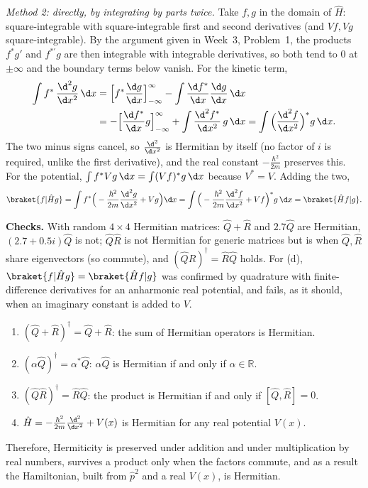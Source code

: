 \begin{solutionbox}
\emph{Method 2: directly, by integrating by parts twice.} Take $f,g$ in the domain of $\hat H$: square-integrable with square-integrable first and second derivatives (and $Vf,Vg$ square-integrable). By the argument given in Week~3, Problem~1, the products $f^*g'$ and $f^{*\prime}g$ are then integrable with integrable derivatives, so both tend to $0$ at $\pm\infty$ and the boundary terms below vanish. For the kinetic term,
\begin{align*}
\int f^*\,\frac{\d^2g}{\d x^2}\,\d x
&=\Big[f^*\frac{\d g}{\d x}\Big]_{-\infty}^{\infty}-\int\frac{\d f^*}{\d x}\frac{\d g}{\d x}\,\d x\\
&=-\Big[\frac{\d f^*}{\d x}g\Big]_{-\infty}^{\infty}+\int\frac{\d^2f^*}{\d x^2}\,g\,\d x
=\int\Big(\frac{\d^2f}{\d x^2}\Big)^*g\,\d x .
\end{align*}
The two minus signs cancel, so $\frac{\d^2}{\d x^2}$ is Hermitian by itself (no factor of $i$ is required, unlike the first derivative), and the real constant $-\frac{\hbar^2}{2m}$ preserves this. For the potential, $\int f^*Vg\,\d x=\int(Vf)^*g\,\d x$ because $V^*=V$. Adding the two,
\[
\braket{f|\hat Hg}=\int f^*\Big(-\frac{\hbar^2}{2m}\frac{\d^2g}{\d x^2}+Vg\Big)\d x=\int\Big(-\frac{\hbar^2}{2m}\frac{\d^2f}{\d x^2}+Vf\Big)^*g\,\d x=\braket{\hat Hf|g}.
\]

\textbf{Checks.} With random $4\times4$ Hermitian matrices: $\hat Q+\hat R$ and $2.7\hat Q$ are Hermitian, $(2.7+0.5i)\hat Q$ is not; $\hat Q\hat R$ is not Hermitian for generic matrices but is when $\hat Q,\hat R$ share eigenvectors (so commute), and $(\hat Q\hat R)^\dagger=\hat R\hat Q$ holds. For (d), $\braket{f|\hat Hg}=\braket{\hat Hf|g}$ was confirmed by quadrature with finite-difference derivatives for an anharmonic real potential, and fails, as it should, when an imaginary constant is added to $V$.
\end{solutionbox}

\begin{answerbox}
\begin{enumerate}[label=(\alph*)]
\item $(\hat Q+\hat R)^\dagger=\hat Q+\hat R$: the sum of Hermitian operators is Hermitian.
\item $(\alpha\hat Q)^\dagger=\alpha^*\hat Q$: $\alpha\hat Q$ is Hermitian if and only if $\alpha\in\mathbb R$.
\item $(\hat Q\hat R)^\dagger=\hat R\hat Q$: the product is Hermitian if and only if $[\hat Q,\hat R]=0$.
\item $\hat H=-\frac{\hbar^2}{2m}\frac{\d^2}{\d x^2}+V(x)$ is Hermitian for any real potential $V(x)$.
\end{enumerate}
Therefore, Hermiticity is preserved under addition and under multiplication by real numbers, survives a product only when the factors commute, and as a result the Hamiltonian, built from $\hat p^2$ and a real $V(x)$, is Hermitian.
\end{answerbox}


